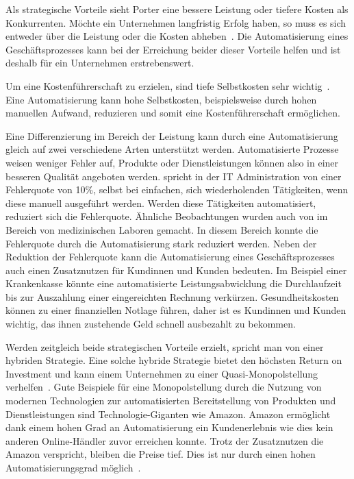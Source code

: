 Als strategische Vorteile sieht Porter eine bessere Leistung oder tiefere Kosten als Konkurrenten. Möchte ein Unternehmen langfristig Erfolg haben, so muss es sich entweder über die Leistung oder die Kosten abheben~\autocite{Capaul2010}. Die Automatisierung eines Geschäftsprozesses kann bei der Erreichung beider dieser Vorteile helfen und ist deshalb für ein Unternehmen erstrebenswert. 

Um eine Kostenführerschaft zu erzielen, sind tiefe Selbstkosten sehr wichtig~\autocite{Capaul2010}. Eine Automatisierung kann hohe Selbstkosten, beispielsweise durch hohen manuellen Aufwand, reduzieren und somit eine Kostenführerschaft ermöglichen.

Eine Differenzierung im Bereich der Leistung kann durch eine Automatisierung gleich auf zwei verschiedene Arten unterstützt werden. Automatisierte Prozesse weisen weniger Fehler auf, Produkte oder Dienstleistungen können also in einer besseren Qualität angeboten werden. \textcite{Kregassner2012} spricht in der IT Administration von einer Fehlerquote von 10\%, selbst bei einfachen, sich wiederholenden Tätigkeiten, wenn diese manuell ausgeführt werden. Werden diese Tätigkeiten automatisiert, reduziert sich die Fehlerquote. Ähnliche Beobachtungen wurden auch von \textcite{Uettwiller-Geiger2005} im Bereich von medizinischen Laboren gemacht. In diesem Bereich konnte die Fehlerquote durch die Automatisierung stark reduziert werden. Neben der Reduktion der Fehlerquote kann die Automatisierung eines Geschäftsprozesses auch einen Zusatznutzen für Kundinnen und Kunden bedeuten. Im Beispiel einer Krankenkasse könnte eine automatisierte Leistungsabwicklung die Durchlaufzeit bis zur Auszahlung einer eingereichten Rechnung verkürzen. Gesundheitskosten können zu einer finanziellen Notlage führen, daher ist es Kundinnen und Kunden wichtig, das ihnen zustehende Geld schnell ausbezahlt zu bekommen.

Werden zeitgleich beide strategischen Vorteile erzielt, spricht man von einer hybriden Strategie. Eine solche hybride Strategie bietet den höchsten Return on Investment und kann einem Unternehmen zu einer Quasi-Monopolstellung verhelfen~\autocite{Lombriser2010}. Gute Beispiele für eine Monopolstellung durch die Nutzung von modernen Technologien zur automatisierten Bereitstellung von Produkten und Dienstleistungen sind Technologie-Giganten wie Amazon. Amazon ermöglicht dank einem hohen Grad an Automatisierung ein Kundenerlebnis wie dies kein anderen Online-Händler zuvor erreichen konnte. Trotz der Zusatznutzen die Amazon verspricht, bleiben die Preise tief. Dies ist nur durch einen hohen Automatisierungsgrad möglich~\autocite{Kha2000}.


